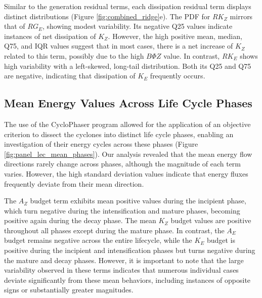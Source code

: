 \documentclass[pdflatex,sn-chicago]{sn-jnl}%
\theoremstyle{plain}
\theoremstyle{definition}
\theoremstyle{remark}
\theoremstyle{definition}
\begin{document}
Similar to the generation residual terms, each dissipation residual term displays distinct distributions (Figure \ref{fig:combined_ridge}e). The PDF for $RK_Z$ mirrors that of $RG_E$, showing modest variability. Its negative Q25 values indicate instances of net dissipation of $K_Z$. However, the high positive mean, median, Q75, and IQR values suggest that in most cases, there is a net increase of $K_Z$ related to this term, possibly due to the high $B\Phi Z$ value. In contrast, $RK_E$ shows high variability with a left-skewed, long-tail distribution. Both its Q25 and Q75 are negative, indicating that dissipation of $K_E$ frequently occurs.

\subsection{Mean Energy Values Across Life Cycle Phases}\label{sec:mean}

The use of the CycloPhaser program allowed for the application of an objective criterion to dissect the cyclones into distinct life cycle phases, enabling an investigation of their energy cycles across these phases (Figure \ref{fig:panel_lec_mean_phases}). Our analysis revealed that the mean energy flow directions rarely change across phases, although the magnitude of each term varies. However, the high standard deviation values indicate that energy fluxes frequently deviate from their mean direction.

The $A_Z$ budget term exhibits mean positive values during the incipient phase, which turn negative during the intensification and mature phases, becoming positive again during the decay phase. The mean $K_Z$ budget values are positive throughout all phases except during the mature phase. In contrast, the $A_E$ budget remains negative across the entire lifecycle, while the $K_E$ budget is positive during the incipient and intensification phases but turns negative during the mature and decay phases. However, it is important to note that the large variability observed in these terms indicates that numerous individual cases deviate significantly from these mean behaviors, including instances of opposite signs or substantially greater magnitudes.
\end{document}
